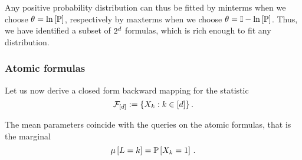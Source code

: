 	

	

	
Any positive probability distribution can thus be fitted by minterms when we choose $\theta=\ln \left[ \mathbb{P} \right]$, respectively by maxterms when we choose $\theta=\mathbb{I}-\ln \left[ \mathbb{P} \right]$.
Thus, we have identified a subset of $2^{d}$ formulas, which is rich enough to fit any distribution.





\subsubsection{Atomic formulas}

Let us now derive a closed form backward mapping for the statistic
	\[ \mathcal{F}_{[d]} := \{X_{k}: k\in[d]\} \, . \]

The mean parameters coincide with the queries on the atomic formulas, that is the marginal 
	\[ \mu\left[L=k\right] = \mathbb{P}\left[X_{k}=1\right]  \, . \]

